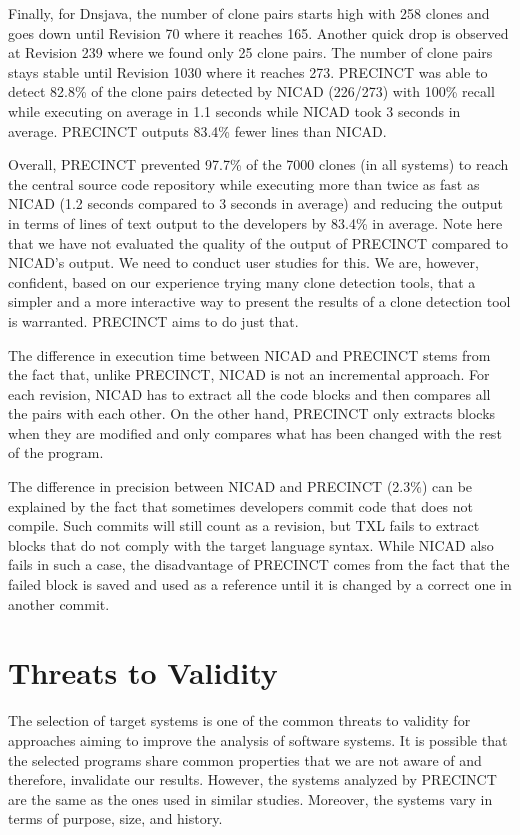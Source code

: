 \documentclass[12pt]{report}
\begin{document}
Finally, for Dnsjava, the number of clone pairs starts high with 258
clones and goes down until Revision 70 where it reaches 165. Another
quick drop is observed at Revision 239 where we found only 25 clone
pairs. The number of clone pairs stays stable until Revision 1030 where
it reaches 273. PRECINCT was able to detect 82.8\% of the clone pairs
detected by NICAD (226/273) with 100\% recall while executing on average
in 1.1 seconds while NICAD took 3 seconds in average. PRECINCT outputs
83.4\% fewer lines than NICAD.

Overall, PRECINCT prevented 97.7\% of the 7000 clones (in all systems)
to reach the central source code repository while executing more than
twice as fast as NICAD (1.2 seconds compared to 3 seconds in average)
and reducing the output in terms of lines of text output to the
developers by 83.4\% in average. Note here that we have not evaluated
the quality of the output of PRECINCT compared to NICAD's output. We
need to conduct user studies for this. We are, however, confident, based
on our experience trying many clone detection tools, that a simpler and
a more interactive way to present the results of a clone detection tool
is warranted. PRECINCT aims to do just that.

The difference in execution time between NICAD and PRECINCT stems from
the fact that, unlike PRECINCT, NICAD is not an incremental approach.
For each revision, NICAD has to extract all the code blocks and then
compares all the pairs with each other. On the other hand, PRECINCT only
extracts blocks when they are modified and only compares what has been
changed with the rest of the program.

The difference in precision between NICAD and PRECINCT (2.3\%) can be
explained by the fact that sometimes developers commit code that does
not compile. Such commits will still count as a revision, but TXL fails
to extract blocks that do not comply with the target language syntax.
While NICAD also fails in such a case, the disadvantage of PRECINCT
comes from the fact that the failed block is saved and used as a
reference until it is changed by a correct one in another commit.

\section{Threats to Validity}\label{threats-to-validity-1}

The selection of target systems is one of the common threats to validity
for approaches aiming to improve the analysis of software systems. It is
possible that the selected programs share common properties that we are
not aware of and therefore, invalidate our results. However, the systems
analyzed by PRECINCT are the same as the ones used in similar studies.
Moreover, the systems vary in terms of purpose, size, and history.
\end{document}
